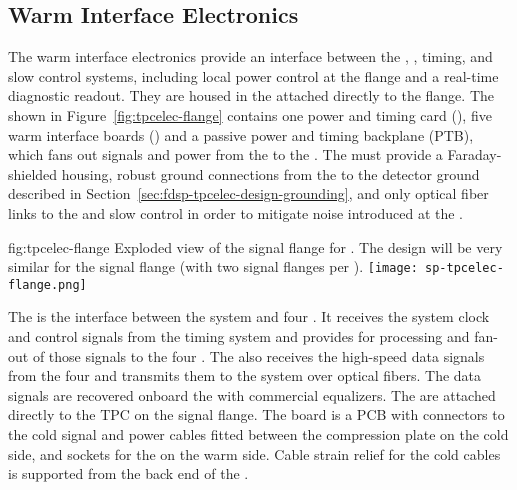 \subsection{Warm Interface Electronics}
\label{sec:fdsp-tpcelec-design-warm}

The warm interface electronics provide an interface between the , , timing, and slow control systems, including local power control at the flange and a real-time diagnostic readout. They are housed in the  attached directly to the  flange.  The  shown in Figure~\ref{fig:tpcelec-flange} contains one power and timing card (), five warm interface boards () and a passive power and timing backplane (PTB), which fans out signals and  power from the  to the . The  must provide a Faraday-shielded housing, robust ground connections from the  to the detector ground described in Section~\ref{sec:fdsp-tpcelec-design-grounding}, and only optical fiber links to the  and slow control in order to mitigate noise introduced at the  \fdth.

\begin{dunefigure}
{fig:tpcelec-flange}
{Exploded view of the  signal flange for .  The design will be very similar for the   signal flange (with two  signal flanges per \fdth).}
\texttt{[image: sp-tpcelec-flange.png]}
\end{dunefigure}

The  is the interface between the  system and four
. It receives the system clock and control signals from the
timing system and provides for processing and fan-out of those signals to the four
. The  also receives the high-speed data signals from the four 
 and transmits them to the  system over optical
fibers. The data signals are recovered onboard the  with commercial equalizers.
The  are attached directly to the TPC
 \fdth on the signal flange. The \fdth
board is a PCB with connectors to the cold signal and  power cables fitted
between the compression plate on the cold side, and sockets for
the  on the warm side. Cable strain relief for the cold cables is 
supported from the back end of the \fdth.

